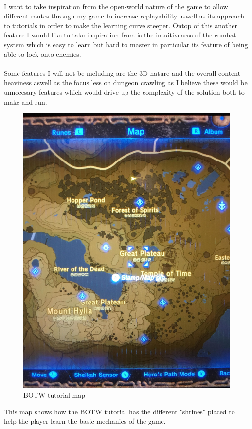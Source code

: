 \documentclass{article}
\begin{document}
        \\
        I want to take inspiration from the open-world nature of the game to allow different routes through my game to increase replayability aswell as its approach to tutorials in order to make the learning curve steeper. Ontop of this another feature I would like to take inspiration from is the intuitiveness of the combat system which is easy to learn but hard to master in particular its feature of being able to lock onto enemies.\\
        \\
        Some features I will not be including are the 3D nature and the overall content heaviness aswell as the focus less on dungeon crawling as I believe these would be unnecesary features which would drive up the complexity of the solution both to make and run.\\
        \begin{figure}[H]
                \centering
                \includegraphics[width = 0.5\columnwidth]{images/research/BOTW_tutorial_map.jpg}
                \caption{BOTW tutorial map}
        \end{figure}
        \noindent This map shows how the BOTW tutorial has the different "shrines" placed to help the player learn the basic mechanics of the game.\\
        \newpage
        \[\]   
\end{document}
